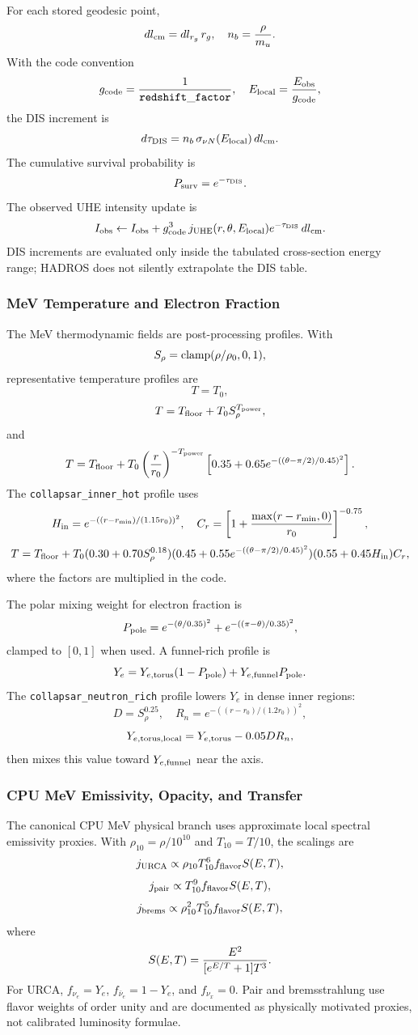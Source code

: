 \documentclass[11pt,a4paper]{article}
\begin{document}
For each stored geodesic point,
\[
dl_{\rm cm}=dl_{r_g}\,r_g,\quad n_b={\rho\over m_u}.
\]
With the code convention
\[
g_{\rm code}={1\over {\tt redshift\_factor}},\quad
E_{\rm local}={E_{\rm obs}\over g_{\rm code}},
\]
the DIS increment is
\[
d\tau_{\rm DIS}=n_b\,\sigma_{\nu N}(E_{\rm local})\,dl_{\rm cm}.
\]
The cumulative survival probability is
\[
P_{\rm surv}=e^{-\tau_{\rm DIS}}.
\]
The observed UHE intensity update is
\[
I_{\rm obs}\leftarrow I_{\rm obs}
 +g_{\rm code}^3\,j_{\rm UHE}(r,\theta,E_{\rm local})
 e^{-\tau_{\rm DIS}}\,dl_{\rm cm}.
\]
DIS increments are evaluated only inside the tabulated cross-section energy
range; HADROS does not silently extrapolate the DIS table.

\subsubsection{MeV Temperature and Electron Fraction}

The MeV thermodynamic fields are post-processing profiles. With
\[
S_\rho={\rm clamp}(\rho/\rho_0,0,1),
\]
representative temperature profiles are
\[
T=T_0,
\]
\[
T=T_{\rm floor}+T_0S_\rho^{T_{\rm power}},
\]
and
\[
T=T_{\rm floor}+T_0\left({r\over r_0}\right)^{-T_{\rm power}}
\left[0.35+0.65e^{-((\theta-\pi/2)/0.45)^2}\right].
\]
The \texttt{collapsar\_inner\_hot} profile uses
\[
H_{\rm in}=e^{-((r-r_{\min})/(1.15r_0))^2},\quad
C_r=\left[1+{\max(r-r_{\min},0)\over r_0}\right]^{-0.75},
\]
\[
T=T_{\rm floor}+T_0
(0.30+0.70S_\rho^{0.18})
(0.45+0.55e^{-((\theta-\pi/2)/0.45)^2})
(0.55+0.45H_{\rm in})C_r,
\]
where the factors are multiplied in the code.

The polar mixing weight for electron fraction is
\[
P_{\rm pole}=e^{-(\theta/0.35)^2}+e^{-((\pi-\theta)/0.35)^2},
\]
clamped to $[0,1]$ when used. A funnel-rich profile is
\[
Y_e=Y_{e,\rm torus}(1-P_{\rm pole})+Y_{e,\rm funnel}P_{\rm pole}.
\]
The \texttt{collapsar\_neutron\_rich} profile lowers $Y_e$ in dense inner
regions:
\[
D=S_\rho^{0.25},\quad
R_n=e^{-((r-r_0)/(1.2r_0))^2},
\]
\[
Y_{e,\rm torus,local}=Y_{e,\rm torus}-0.05DR_n,
\]
then mixes this value toward $Y_{e,\rm funnel}$ near the axis.

\subsubsection{CPU MeV Emissivity, Opacity, and Transfer}

The canonical CPU MeV physical branch uses approximate local spectral
emissivity proxies. With $\rho_{10}=\rho/10^{10}$ and $T_{10}=T/10$, the
scalings are
\[
j_{\rm URCA}\propto \rho_{10}T_{10}^6 f_{\rm flavor}S(E,T),
\]
\[
j_{\rm pair}\propto T_{10}^9 f_{\rm flavor}S(E,T),
\]
\[
j_{\rm brems}\propto \rho_{10}^2T_{10}^5 f_{\rm flavor}S(E,T),
\]
where
\[
S(E,T)={E^2\over [e^{E/T}+1]T^3}.
\]
For URCA, $f_{\nu_e}=Y_e$, $f_{\bar{\nu}_e}=1-Y_e$, and $f_{\nu_x}=0$.
Pair and bremsstrahlung use flavor weights of order unity and are documented
as physically motivated proxies, not calibrated luminosity formulae.
\end{document}
